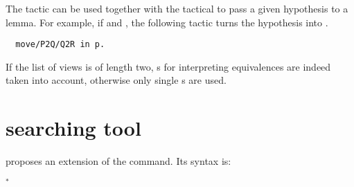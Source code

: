 The tactic  can be used together with the 
tactical to pass a given hypothesis to a lemma. For example, if
 and , the following
tactic turns the hypothesis  into .
\begin{lstlisting}
  move/P2Q/Q2R in p.
\end{lstlisting}

If the list of views is of length two, s for interpreting
equivalences are indeed taken into account, otherwise only single
s are used.
\section{\ssr{} searching tool}

\ssr{} proposes an extension of the  command. Its syntax is:

\begin{center}
	  $^*$ 
\end{center}


